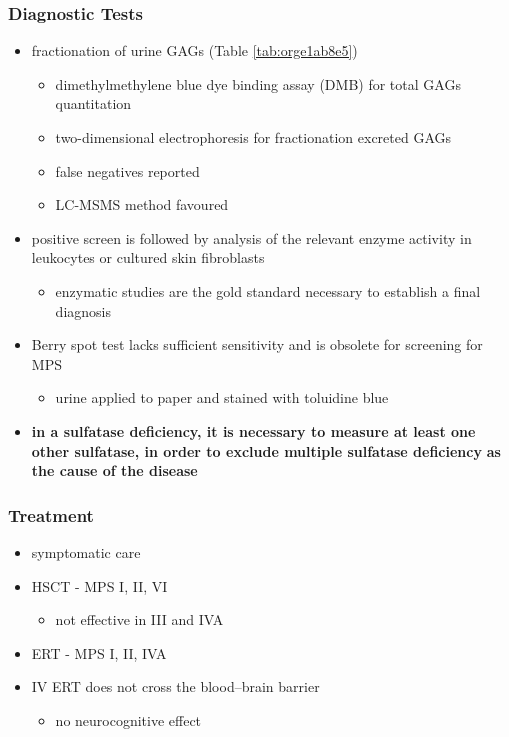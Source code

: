 \documentclass[12pt]{scrartcl}
\begin{document}
\subsubsection{Diagnostic Tests}
\label{sec:orgb51dc7e}
\begin{itemize}
\item fractionation of urine GAGs (Table \ref{tab:orge1ab8e5})
\begin{itemize}
\item dimethylmethylene blue dye binding assay (DMB) for total GAGs
quantitation
\item two-dimensional electrophoresis for fractionation excreted GAGs
\item false negatives reported
\item LC-MSMS method favoured
\end{itemize}
\item positive screen is followed by analysis of the relevant enzyme
activity in leukocytes or cultured skin fibroblasts
\begin{itemize}
\item enzymatic studies are the gold standard necessary to establish a
final diagnosis
\end{itemize}
\item Berry spot test lacks sufficient sensitivity and is obsolete for
screening for MPS
\begin{itemize}
\item urine applied to paper and stained with toluidine blue
\end{itemize}
\item \textbf{in a sulfatase deficiency, it is necessary to measure at least one}
\textbf{other sulfatase, in order to exclude multiple sulfatase deficiency}
\textbf{as the cause of the disease}
\end{itemize}

\subsubsection{Treatment}
\label{sec:orgbf6da77}
\begin{itemize}
\item symptomatic care
\item HSCT - MPS I, II, VI
\begin{itemize}
\item not effective in III and IVA
\end{itemize}
\item ERT - MPS I, II, IVA
\item IV ERT does not cross the blood–brain barrier
\begin{itemize}
\item no neurocognitive effect
\end{itemize}
\end{itemize}
\end{document}
